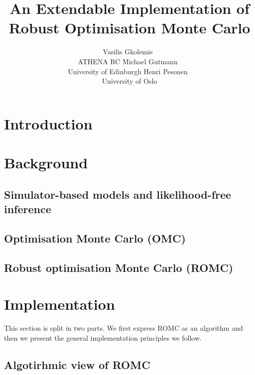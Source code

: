 \documentclass[article]{jss}
\author{Vasilis Gkolemis~\orcidlink{0000-0002-2636-0245}\\ATHENA RC \And
  Michael Gutmann~\orcidlink{0000-0002-5329-9910}\\University of Edinburgh \And
  Henri Pesonen~\orcidlink{0000-0003-4500-2926}\\University of Oslo
}
\title{An Extendable \proglang{Python} Implementation of Robust Optimisation Monte Carlo}
\begin{document}
\section{Introduction} \label{sec:intro}


\section{Background}


\subsection{Simulator-based models and likelihood-free inference}


\subsection{Optimisation Monte Carlo (OMC)}


\subsection{Robust optimisation Monte Carlo (ROMC)}


\subsection[Engine for likelihood-free inference (ELFI)]{}
\label{subsec:ELFI}


\section{Implementation}
This section is split in two parts. We first express ROMC as an
algorithm and then we present the general implementation principles we
follow.

\subsection{Algotirhmic view of ROMC}

\end{document}
